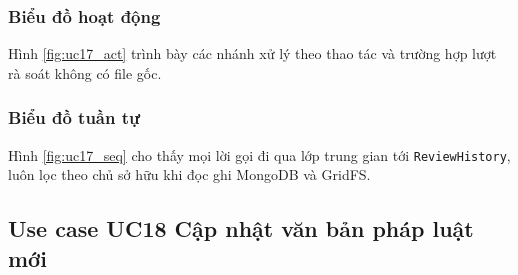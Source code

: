 \documentclass[../DoAn.tex]{subfiles}
\begin{document}
\subsubsection{Biểu đồ hoạt động}
Hình \ref{fig:uc17_act} trình bày các nhánh xử lý theo thao tác và trường hợp lượt rà soát không có file gốc.


\subsubsection{Biểu đồ tuần tự}
Hình \ref{fig:uc17_seq} cho thấy mọi lời gọi đi qua lớp trung gian tới \texttt{ReviewHistory}, luôn lọc theo chủ sở hữu khi đọc ghi MongoDB và GridFS.



\subsection{Use case UC18 Cập nhật văn bản pháp luật mới}
\label{subsection:uc18}
\end{document}
